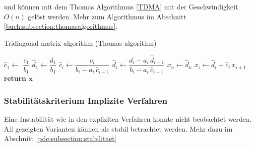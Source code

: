 	   und k\"onnen mit dem Thomas Algorithmus \autoref{TDMA} \cite{burgers:thomas} mit der Geschwindigkeit $O(n)$ gel\"ost werden.
	   Mehr zum Algorithmus im Abschnitt \ref{buch:subsection:thomasalgorithmus}.

	\begin{algorithm}\caption{Tridiagonal matrix algorithm (Thomas algorithm)}\label{TDMA}
	  \setlength{\lineskip}{7pt}
	  \begin{algorithmic}[1]
	      \State $\hat c_1 \gets$ $ \dfrac{c_1}{b_1}$
	      \State $\hat d_1 \gets \dfrac{d_1}{b_1}$
	        \State $\hat c_i \gets \dfrac{c_i}{b_i-a_i \, \hat c_{i-1}}$
	      \EndFor
	        \State $\hat d_i \gets \dfrac{d_i - a_i \, \hat d_{i-1}}{b_i-a_i \, \hat c_{i-1}}$
	      \EndFor
	      \State $x_n \gets \hat d_n$
	        \State $x_i \gets \hat d_i - \hat c_i \, x_{i+1}$
	      \EndFor
	      \State \textbf{return} $\textbf{x}$
	    \EndFunction
	  \end{algorithmic}
	\end{algorithm}

	\subsubsection{Stabilit\"atskriterium Implizite Verfahren}

	Eine Instabilit\"at wie in den expliziten Verfahren konnte nicht beobachtet werden.
	All gezeigten Varianten k\"onnen als stabil betrachtet werden.
	Mehr dazu im Abschnitt \ref{pde:subsection:stabilitaet}
